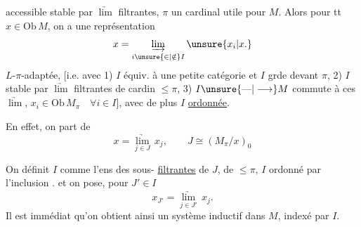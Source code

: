 accessible stable par $\underrightarrow{\lim}$ filtrantes, $\pi$ un cardinal utile pour $M$. Alors pour tt $x\in\mathrm{Ob}\,M$, on a une représentation
\[
x=\underset{i\unsure{\in|\notin} I}{\underrightarrow{\lim}}\,\unsure{x_i|x.}
\]
$L$-$\pi$-adaptée, [i.e. avec 1) $I$ équiv. à une petite catégorie et $I$ grde devant $\pi$, 2) $I$ stable par $\underrightarrow{\lim}$ filtrantes de cardin $\leq\pi$, 3) $I\unsure{\text{---}|\longrightarrow}M$ commute à ces $\underrightarrow{\lim}$,  $x_i\in\mathrm{Ob}\,M_\pi\quad\forall i\in I$], avec de plus $I$ \uline{ordonnée}.

En effet, on part de
\[
x=\underset{j\in J}{\underrightarrow{\lim}}\,x_j,\qquad
J\cong(M_\pi/x)_0
\]

 On définit $I$ comme l'ens des sous- \uline{filtrantes}   de $J$, de   $\leq\pi$,  $I$ ordonné par l'inclusion .  et on pose, pour $J'\in I$
\[
x_{J'}=\underset{j\in J'}{\underrightarrow{\lim}}\,x_j.
\]
Il est immédiat qu'on obtient ainsi un système inductif dans $M$, indexé par $I$.
